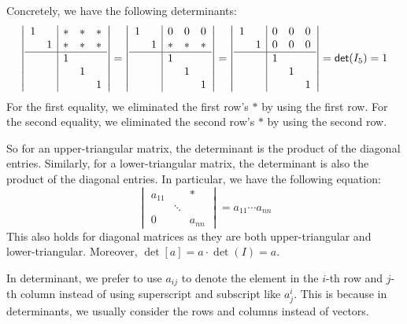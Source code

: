 Concretely, we have the following determinants:
\[
  \left|
  \begin{array}{cc|ccc}
    1 &   & * & * & * \\
      & 1 & * & * & * \\
    \hline
      &   & 1 &   &   \\
      &   &   & 1 &   \\
      &   &   &   & 1
  \end{array}
  \right| = \left|
  \begin{array}{cc|ccc}
    1 &   & 0 & 0 & 0 \\
      & 1 & * & * & * \\
    \hline
      &   & 1 &   &   \\
      &   &   & 1 &   \\
      &   &   &   & 1
  \end{array}
  \right| = \left|
  \begin{array}{cc|ccc}
    1 &   & 0 & 0 & 0 \\
      & 1 & 0 & 0 & 0 \\
    \hline
      &   & 1 &   &   \\
      &   &   & 1 &   \\
      &   &   &   & 1
  \end{array}
  \right| = \det(I_5) = 1
\]
For the first equality, we eliminated the first row's $*$ by using the first row. For the second equality, we eliminated the second row's $*$ by using the second row.

So for an upper-triangular matrix, the determinant is the product of the diagonal entries. Similarly, for a lower-triangular matrix, the determinant is also the product of the diagonal entries. In particular, we have the following equation:
\[
  \begin{vmatrix}
    a_{11} &        & *      \\
           & \ddots &        \\
    0      &        & a_{nn}
  \end{vmatrix} = a_{11} \cdots a_{nn}
\]
This also holds for diagonal matrices as they are both upper-triangular and lower-triangular. Moreover, $\det[a] = a \cdot \det(I) = a$.
\begin{remark}
  In determinant, we prefer to use $a_{ij}$ to denote the element in the $i$-th row and $j$-th column instead of using superscript and subscript like $a_j^{i}$. This is because in determinants, we usually consider the rows and columns instead of vectors.
\end{remark}

